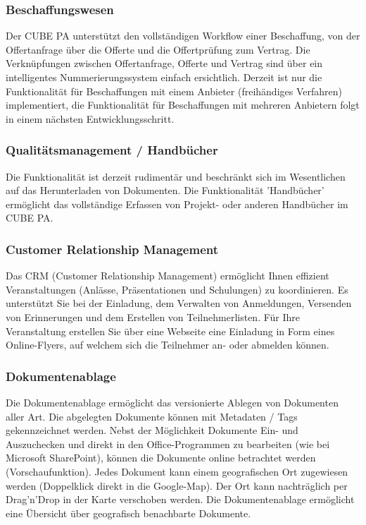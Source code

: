 \subsubsection{Beschaffungswesen}

Der CUBE PA unterstützt den vollständigen Workflow einer Beschaffung, von der Offertanfrage über die Offerte und die Offertprüfung zum Vertrag. Die Verknüpfungen zwischen Offertanfrage, Offerte und Vertrag sind über ein intelligentes Nummerierungssystem einfach ersichtlich. Derzeit ist nur die Funktionalität für Beschaffungen mit einem Anbieter (freihändiges Verfahren) implementiert, die Funktionalität für Beschaffungen mit mehreren Anbietern folgt in einem nächsten Entwicklungsschritt.

\subsubsection{Qualitätsmanagement / Handbücher}

Die Funktionalität ist derzeit rudimentär und beschränkt sich im Wesentlichen auf das Herunterladen von Dokumenten. Die Funktionalität 'Handbücher' ermöglicht das vollständige Erfassen von Projekt- oder anderen Handbücher im CUBE PA.

\subsubsection{Customer Relationship Management}

Das CRM (Customer Relationship Management) ermöglicht Ihnen effizient Veranstaltungen (Anlässe, Präsentationen und Schulungen) zu koordinieren. Es unterstützt Sie bei der Einladung, dem Verwalten von Anmeldungen, Versenden von Erinnerungen und dem Erstellen von Teilnehmerlisten. Für Ihre Veranstaltung erstellen Sie über eine Webseite eine Einladung in Form eines Online-Flyers, auf welchem sich die Teilnehmer an- oder abmelden können.

\subsubsection{Dokumentenablage}

Die Dokumentenablage ermöglicht das versionierte Ablegen von Dokumenten aller Art. Die abgelegten Dokumente können mit Metadaten / Tags gekennzeichnet werden. Nebst der Möglichkeit Dokumente Ein- und Auszuchecken und direkt in den Office-Programmen zu bearbeiten (wie bei Microsoft SharePoint), können die Dokumente online betrachtet werden (Vorschaufunktion). Jedes Dokument kann einem geografischen Ort zugewiesen werden (Doppelklick direkt in die Google-Map). Der Ort kann nachträglich per Drag’n’Drop in der Karte verschoben werden. Die Dokumentenablage ermöglicht eine Übersicht über geografisch benachbarte Dokumente.


